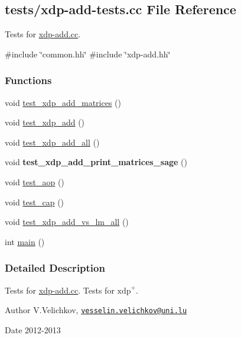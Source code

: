 \hypertarget{xdp-add-tests_8cc}{\subsection{tests/xdp-\/add-\/tests.cc \-File \-Reference}
\label{xdp-add-tests_8cc}
}


\-Tests for \hyperlink{xdp-add_8cc}{xdp-\/add.\-cc}.  


{\ttfamily \#include \char`\"{}common.\-hh\char`\"{}}\*
{\ttfamily \#include \char`\"{}xdp-\/add.\-hh\char`\"{}}\*
\subsubsection*{\-Functions}
\begin{DoxyCompactItemize}
\item 
void \hyperlink{xdp-add-tests_8cc_a1c58e7b99830e6627d36983f66156d1d}{test\-\_\-xdp\-\_\-add\-\_\-matrices} ()
\item 
void \hyperlink{xdp-add-tests_8cc_a01b500c0621ae49ccc5aec367a934ed3}{test\-\_\-xdp\-\_\-add} ()
\item 
void \hyperlink{xdp-add-tests_8cc_a4b00cd22eda75c586c869d26df61dc51}{test\-\_\-xdp\-\_\-add\-\_\-all} ()
\item 
\hypertarget{xdp-add-tests_8cc_a4e72163aaab8f688ce7c07dcb37e78b1}{void {\bfseries test\-\_\-xdp\-\_\-add\-\_\-print\-\_\-matrices\-\_\-sage} ()}\label{xdp-add-tests_8cc_a4e72163aaab8f688ce7c07dcb37e78b1}

\item 
void \hyperlink{xdp-add-tests_8cc_a26bc444603f2b30a3c2db49b10f643d5}{test\-\_\-aop} ()
\item 
void \hyperlink{xdp-add-tests_8cc_adb4a1978f5226f793f2642eb2fc5b22d}{test\-\_\-cap} ()
\item 
void \hyperlink{xdp-add-tests_8cc_a74d83491b1aa5982f588cd26a79d2b3f}{test\-\_\-xdp\-\_\-add\-\_\-vs\-\_\-lm\-\_\-all} ()
\item 
int \hyperlink{xdp-add-tests_8cc_ae66f6b31b5ad750f1fe042a706a4e3d4}{main} ()
\end{DoxyCompactItemize}


\subsubsection{\-Detailed \-Description}
\-Tests for \hyperlink{xdp-add_8cc}{xdp-\/add.\-cc}. \-Tests for $\mathrm{xdp}^{+}$.

\begin{DoxyAuthor}{\-Author}
\-V.\-Velichkov, \href{mailto:vesselin.velichkov@uni.lu}{\tt vesselin.\-velichkov@uni.\-lu} 
\end{DoxyAuthor}
\begin{DoxyDate}{\-Date}
2012-\/2013 
\end{DoxyDate}


